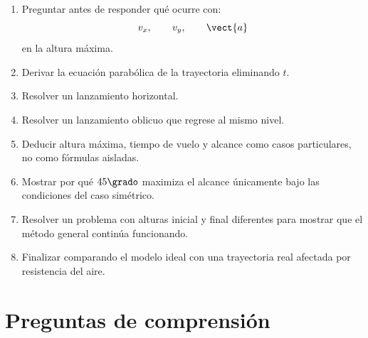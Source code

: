 \begin{notapedagogica}
\begin{enumerate}
    \item Preguntar antes de responder qué ocurre con:
    \[
    v_x,\qquad v_y,\qquad\vect{a}
    \]
    en la altura máxima.

    \item Derivar la ecuación parabólica de la trayectoria eliminando \(t\).

    \item Resolver un lanzamiento horizontal.

    \item Resolver un lanzamiento oblicuo que regrese al mismo nivel.

    \item Deducir altura máxima, tiempo de vuelo y alcance como casos particulares,
    no como fórmulas aisladas.

    \item Mostrar por qué \(45\grado\) maximiza el alcance únicamente bajo las
    condiciones del caso simétrico.

    \item Resolver un problema con alturas inicial y final diferentes para mostrar
    que el método general continúa funcionando.

    \item Finalizar comparando el modelo ideal con una trayectoria real afectada por
    resistencia del aire.
\end{enumerate}
\end{notapedagogica}


\section{Preguntas de comprensión}

